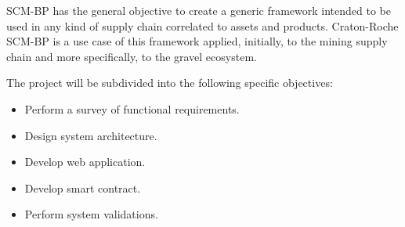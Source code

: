 
\acresetall 

\ac{SCM-BP} has the general objective to create a generic framework intended to be used in any kind of supply chain correlated to assets and products. 
Craton-Roche SCM-BP is a use case of this framework applied, initially, to the mining supply chain and more specifically, to the gravel ecosystem.

The project will be subdivided into the following specific objectives:
\begin{itemize}
\item Perform a survey of functional requirements.
\item Design system architecture.
\item Develop web application.
\item Develop smart contract.
\item Perform system validations.
\end{itemize}




%


